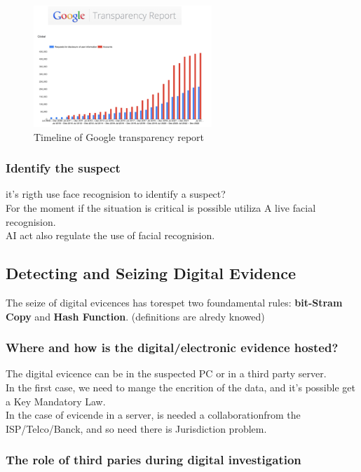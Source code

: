 \begin{figure}[h!]
  \centering
  \includegraphics[width=0.6\textwidth]{img/transp_report.png}
  \caption{Timeline of Google transparency report}
  \label{fig:transparency report}
\end{figure}

\subsubsection{Identify the suspect}
it's rigth use face recognision to identify a suspect? \\
For the moment if the situation is critical is possible utiliza A
live facial recognision. \\
AI act also regulate the use of facial recognision. %

\subsection{Detecting and Seizing Digital Evidence}
The seize of digital evicences has torespet two foundamental rules: \textbf{bit-Stram Copy} and
\textbf{Hash Function}. (definitions are alredy knowed)

\subsubsection{Where and how is the digital/electronic evidence hosted?}
The digital evicence can be in the suspected PC or in a third party server. \\
In the first case, we need to mange the encrition of the data, and it's possible get a Key Mandatory Law. \\
In the case of evicende in a server, is needed a collaborationfrom the ISP/Telco/Banck, and so need there is Jurisdiction problem.

\subsubsection{The role of third paries during digital investigation}

